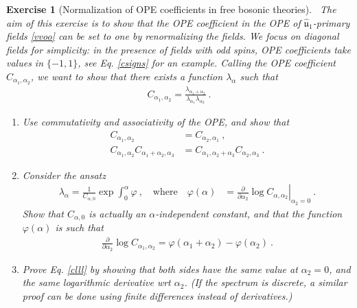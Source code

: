 \documentclass[12pt, a4paper, notitlepage, twoside]{report}
\numberwithin{equation}{section}
\theoremstyle{break}
\newtheorem{exo}{Exercise}[chapter]
\begin{document}
\begin{exo}[Normalization of OPE coefficients in free bosonic theories]
 ~\label{exoone}
The aim of this exercise is to show that the OPE coefficient in the OPE of $\hat{\mathfrak{u}}_1$-primary fields \eqref{vvoo} can be set to one by renormalizing the fields.
We focus on diagonal fields for simplicity: in the presence of fields with odd spins, OPE coefficients take values in $\{-1,1\}$, see Eq. \eqref{csigns} for an example.
Calling the OPE coefficient $C_{\alpha_1,\alpha_2}$, we want to show that there exists a function $\lambda_{\alpha}$ such that 
\begin{align}
 C_{\alpha_1,\alpha_2} = \frac{\lambda_{\alpha_1+\alpha_2}}{\lambda_{\alpha_1}\lambda_{\alpha_2}}\ .
\label{clll}
\end{align}
\begin{enumerate}
 \item Use commutativity and associativity of the OPE, and show that 
\begin{align}
C_{\alpha_1,\alpha_2} &= C_{\alpha_2,\alpha_1}\ ,
\\
 C_{\alpha_1,\alpha_2}C_{\alpha_1+\alpha_2,\alpha_3} &= C_{\alpha_1,\alpha_2+\alpha_3}C_{\alpha_2,\alpha_3}\ .
\end{align}

\item Consider the ansatz
\begin{align}
  \lambda_{\alpha} = \frac{1}{C_{\alpha,0}} \exp \int_0^{\alpha} \varphi \ , \quad \text{where}\quad  
 \varphi(\alpha)&=\left.{\frac{\partial}{\partial \alpha_2}}\log C_{\alpha,\alpha_2}\right|_{\alpha_2=0}\ .
\end{align}
Show that $C_{\alpha,0}$ is actually an $\alpha$-independent constant, and that the function $\varphi(\alpha)$ is such that
\begin{align}
 {\frac{\partial}{\partial \alpha_2}} \log C_{\alpha_1,\alpha_2}  = \varphi(\alpha_1+\alpha_2)-\varphi(\alpha_2)\ . 
\end{align}

\item
Prove Eq. \eqref{clll} by showing that both sides have the same value at $\alpha_2=0$, and the same logarithmic derivative wrt $\alpha_2$. 
(If the spectrum is discrete, a similar proof can be done using finite differences instead of derivatives.) 
\end{enumerate}
\end{exo}
\end{document}

